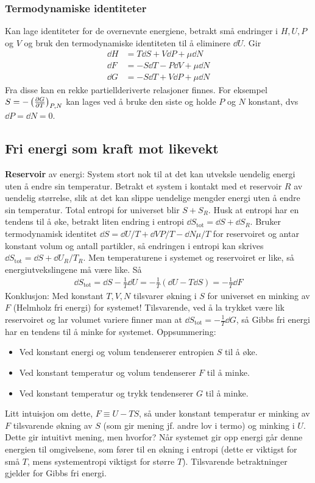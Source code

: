 \documentclass[12pt]{article}
\begin{document}
\subsubsection{Termodynamiske identiteter}
Kan lage identiteter for de overnevnte energiene, betrakt små endringer i $H, U, P$ og $V$
og bruk den termodynamiske identiteten til å eliminere $\dd U$. Gir
\begin{align*}
  \dd H &= T \dd S + V \dd P + \mu \dd N \\
  \dd F &= -S \dd T - P \dd V + \mu \dd N \\
  \dd G &= -S \dd T + V \dd P + \mu \dd N
\end{align*}
Fra disse kan en rekke partiellderiverte relasjoner finnes. For eksempel
$
  S = -\left( \pdv{G}{T} \right)_{P,N}
$ kan lages ved å bruke den siste og holde $P$ og $N$ konstant, dvs $\dd P = \dd N = 0$.
\subsection{Fri energi som kraft mot likevekt}
\textbf{Reservoir} av energi: System stort nok til at det kan utveksle uendelig
energi uten å endre sin temperatur. \newline \noindent
Betrakt et system i kontakt med et reservoir $R$ av uendelig størrelse, slik at
det kan slippe uendelige mengder energi uten å endre sin temperatur. Total entropi
for universet blir $S + S_R$. Husk at entropi har en tendens til å øke, betrakt
liten endring i entropi $\dd S_\text{tot} = \dd S + \dd S_R$. Bruker termodynamisk identitet $\dd S = \dd U /T + \dd V P/T - \dd N \mu /T$
for reservoiret og antar konstant volum og antall partikler, så endringen i entropi kan skrives $\dd S_\text{tot} = \dd S + \dd U_R / T_R$.
Men temperaturene i systemet og reservoiret er like, så energiutvekslingene må være like. Så
\begin{align*}
  \dd S_\text{tot} = \dd S - \frac{1}{T} \dd U = - \frac{1}{T}(\dd U - T\dd S) = - \frac{1}{T} \dd F
\end{align*}
Konklusjon: Med konstant $T, V, N$ tilsvarer økning i $S$ for universet en minking
av $F$ (Helmholz fri energi) for systemet! Tilsvarende, ved å la trykket være lik reservoiret og
lar volumet variere finner man at $\dd S_\text{tot} = -\frac{1}{T}\dd G$, så Gibbs fri
energi har en tendens til å minke for systemet. Oppsummering:
\begin{itemize}
  \item Ved konstant energi og volum tendenserer entropien $S$ til å øke.
  \item Ved konstant temperatur og volum tendenserer $F$ til å minke.
  \item Ved konstant temperatur og trykk tendenserer $G$ til å minke.
\end{itemize}
Litt intuisjon om dette, $F \equiv U - TS$, så under konstant temperatur er minking av
$F$ tilsvarende økning av $S$ (som gir mening jf. andre lov i termo) og minking i $U$. Dette
gir intuitivt mening, men hvorfor? Når systemet gir opp energi går denne energien til
omgivelsene, som fører til en økning i entropi (dette er viktigst for små $T$, mens systementropi viktigst for større $T$).
Tilsvarende betraktninger gjelder for Gibbs fri energi.
\end{document}
